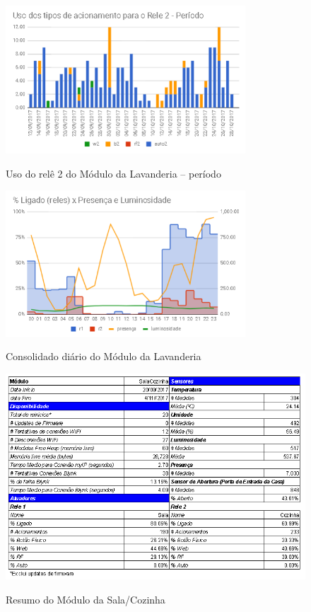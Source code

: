 \begin{figure}[H]
	\centering
	\caption{Uso do relê 2 do Módulo da Lavanderia -- período}
	\includegraphics[width=0.8\textwidth]{UsoRele2LavanderiaPeriodo}
	\label{fig:UsoRele2LavanderiaPeriodo}
\end{figure}

\begin{figure}[H]
	\centering
	\caption{Consolidado diário do Módulo da Lavanderia}
	\includegraphics[width=0.8\textwidth]{RelesPresLumiLavanderia}
	\label{fig:RelesPresLumiLavanderia}
\end{figure}

\begin{figure}[H]
	\centering
	\caption{Resumo do Módulo da Sala/Cozinha}
	\includegraphics[width=1.0\textwidth]{resumoSalaCozinha}
	\label{fig:resumoSalaCozinha}
\end{figure}

